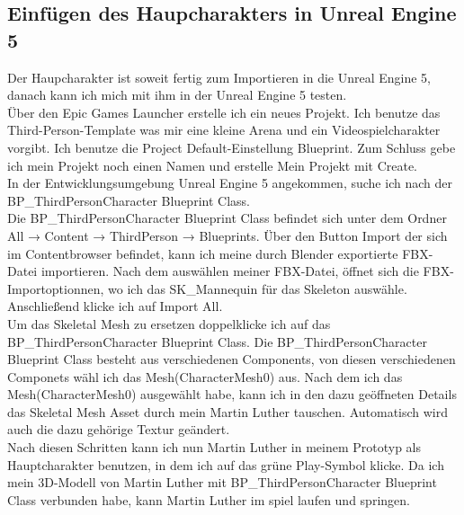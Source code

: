 \subsection{Einfügen des Haupcharakters in Unreal Engine 5}
Der Haupcharakter ist soweit fertig zum Importieren in die Unreal Engine 5, danach kann ich mich mit ihm in der Unreal Engine 5 testen.
\\
Über den Epic Games Launcher erstelle ich ein neues Projekt. Ich benutze das Third-Person-Template was mir eine kleine Arena und ein Videospielcharakter vorgibt. Ich benutze die Project Default-Einstellung Blueprint. Zum Schluss gebe ich mein Projekt noch einen Namen und erstelle Mein Projekt mit Create.
\\
In der Entwicklungsumgebung Unreal Engine 5 angekommen, suche ich nach der BP\_ThirdPersonCharacter Blueprint Class.
\\
Die BP\_ThirdPersonCharacter Blueprint Class befindet sich unter dem Ordner All → Content → ThirdPerson → Blueprints. Über den Button Import der sich im Contentbrowser befindet, kann ich meine durch Blender exportierte FBX-Datei importieren. Nach dem auswählen meiner FBX-Datei, öffnet sich die FBX-Importoptionnen, wo ich das SK\_Mannequin für das Skeleton auswähle. Anschließend klicke ich auf Import All.
\\
Um das Skeletal Mesh zu ersetzen doppelklicke ich auf das BP\_ThirdPersonCharacter Blueprint Class. Die BP\_ThirdPersonCharacter Blueprint Class besteht aus verschiedenen Components, von diesen verschiedenen Componets wähl ich das Mesh(CharacterMesh0) aus. Nach dem ich das Mesh(CharacterMesh0) ausgewählt habe, kann ich in den dazu geöffneten Details das Skeletal Mesh Asset durch mein Martin Luther tauschen. Automatisch wird auch die dazu gehörige Textur geändert.
\\
Nach diesen Schritten kann ich nun Martin Luther in meinem Prototyp als Hauptcharakter benutzen, in dem ich auf das grüne Play-Symbol klicke. Da ich mein 3D-Modell von Martin Luther mit BP\_ThirdPersonCharacter Blueprint Class verbunden habe, kann Martin Luther im spiel laufen und springen.

%
%
%
%
